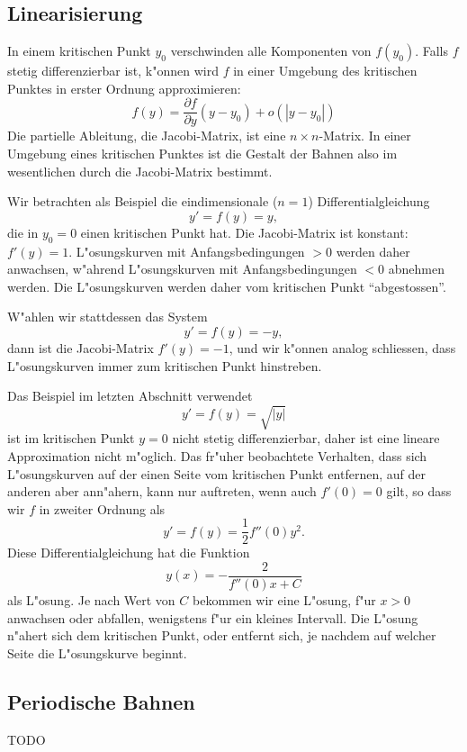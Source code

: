%
%
\subsection{Linearisierung}
In einem kritischen Punkt $y_0$ verschwinden alle Komponenten von $f(y_0)$.
Falls $f$ stetig differenzierbar ist, k"onnen wird $f$ in einer Umgebung
des kritischen Punktes in erster Ordnung approximieren:
\[
f(y)=\frac{\partial f}{\partial y}(y-y_0) + o(|y-y_0|)
\]
Die partielle Ableitung, die Jacobi-Matrix, ist eine $n\times n$-Matrix.
In einer Umgebung eines kritischen Punktes ist die Gestalt der Bahnen also
im wesentlichen durch die Jacobi-Matrix bestimmt.

\begin{beispiel}
Wir betrachten als Beispiel die eindimensionale ($n=1$) Differentialgleichung
\[
y'=f(y)=y,
\]
die in $y_0=0$ einen kritischen Punkt hat.
Die Jacobi-Matrix ist konstant: $f'(y)=1$.
L"osungskurven mit Anfangsbedingungen $>0$ werden daher anwachsen,
w"ahrend L"osungskurven mit Anfangsbedingungen $<0$ abnehmen werden.
Die L"osungskurven werden daher vom kritischen Punkt ``abgestossen''.

W"ahlen wir stattdessen das System
\[
y'=f(y)=-y,
\]
dann ist die Jacobi-Matrix $f'(y)=-1$, und wir k"onnen analog schliessen,
dass L"osungskurven immer zum kritischen Punkt hinstreben.
\end{beispiel}

\begin{beispiel}
Das Beispiel im letzten Abschnitt verwendet
\[
y'=f(y)=\sqrt{|y|}
\]
ist im kritischen Punkt $y=0$ nicht stetig differenzierbar, daher ist
eine lineare Approximation nicht m"oglich.
Das fr"uher beobachtete Verhalten, dass sich L"osungskurven auf der
einen Seite vom kritischen Punkt entfernen, auf der anderen aber ann"ahern,
kann nur auftreten, wenn auch $f'(0)=0$ gilt, so dass wir $f$ in zweiter
Ordnung als
\[
y'=f(y)=\frac12 f''(0)y^2.
\]
Diese Differentialgleichung hat die Funktion
\[
y(x)=-\frac{2}{f''(0)x+C}
\]
als L"osung.
Je nach Wert von $C$ bekommen wir eine L"osung, f"ur $x>0$ anwachsen
oder abfallen, wenigstens f"ur ein kleines Intervall.
Die L"osung n"ahert sich dem kritischen Punkt, oder entfernt sich, je
nachdem auf welcher Seite die L"osungskurve beginnt.
\end{beispiel}

%
%
\subsection{Periodische Bahnen}
TODO

